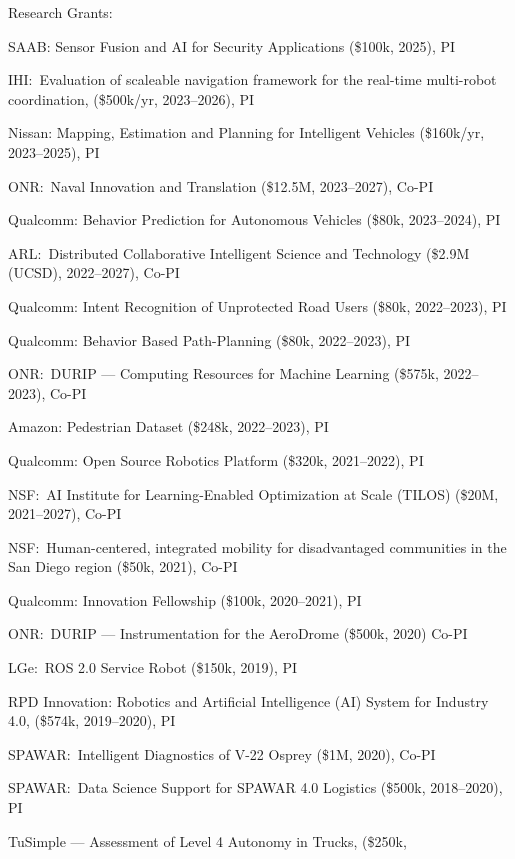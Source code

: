 \documentclass{article}
\begin{document}
\begin{cv}
	\begin{cvlist}{Research Grants:}
		\item SAAB: Sensor Fusion and AI for Security Applications (\$100k, 2025), PI
		\item IHI:\ Evaluation of scaleable navigation framework for the real-time
    		multi-robot coordination, (\$500k/yr, 2023--2026), PI
		\item Nissan: Mapping, Estimation and Planning for Intelligent Vehicles
		(\$160k/yr, 2023--2025), PI
		\item ONR:\ Naval Innovation and Translation (\$12.5M, 2023--2027), Co-PI
		\item Qualcomm: Behavior Prediction for Autonomous Vehicles (\$80k, 2023--2024), PI
		\item ARL:\ Distributed Collaborative Intelligent Science and Technology (\$2.9M
		(UCSD), 2022--2027), Co-PI
		\item Qualcomm: Intent Recognition of Unprotected Road Users (\$80k, 2022--2023),
		PI
		\item Qualcomm: Behavior Based Path-Planning (\$80k, 2022--2023), PI
		\item ONR:\ DURIP --- Computing Resources for Machine Learning (\$575k, 2022--2023),
		Co-PI
		\item Amazon: Pedestrian Dataset (\$248k, 2022--2023), PI
		\item Qualcomm: Open Source Robotics Platform (\$320k, 2021--2022), PI
		\item NSF:\ AI Institute for Learning-Enabled Optimization at Scale
		(TILOS) (\$20M, 2021--2027), Co-PI
		\item NSF:\ Human-centered, integrated mobility for disadvantaged
		communities in the San Diego region (\$50k, 2021), Co-PI
		\item Qualcomm: Innovation Fellowship (\$100k, 2020--2021), PI
		\item ONR:\ DURIP --- Instrumentation for the AeroDrome (\$500k, 2020) Co-PI
		\item LGe:\ ROS 2.0 Service Robot (\$150k, 2019), PI
		\item RPD Innovation: Robotics and Artificial Intelligence (AI) System for
		Industry 4.0, (\$574k, 2019--2020), PI
		\item SPAWAR:\ Intelligent Diagnostics of V-22 Osprey (\$1M, 2020), Co-PI
		\item SPAWAR:\ Data Science Support for SPAWAR 4.0 Logistics (\$500k,
		2018--2020), PI
		\item TuSimple --- Assessment of Level 4 Autonomy in Trucks,  (\$250k,

\end{cvlist}
\end{cv}
\end{document}
